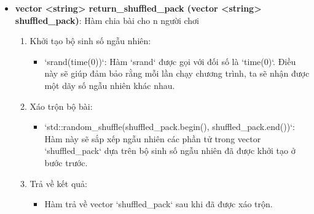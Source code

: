 \documentclass{article}
\begin{document}
\begin{itemize}
    \item \textbf{vector <string> return\_shuffled\_pack (vector <string> shuffled\_pack)}: Hàm chia bài cho n người chơi
    \begin{description}
        \begin{enumerate}
            \item Khởi tạo bộ sinh số ngẫu nhiên:
                \begin{itemize}
                    \item `srand(time(0))`: Hàm `srand` được gọi với đối số là `time(0)`. Điều này sẽ giúp đảm bảo rằng mỗi lần chạy chương trình, ta sẽ nhận được một dãy số ngẫu nhiên khác nhau.
                \end{itemize}
            \item Xáo trộn bộ bài:
                \begin{itemize}
                    \item `std::random\_shuffle(shuffled\_pack.begin(), shuffled\_pack.end())`: Hàm này sẽ sắp xếp ngẫu nhiên các phần tử trong vector `shuffled\_pack` dựa trên bộ sinh số ngẫu nhiên đã được khởi tạo ở bước trước.
                \end{itemize}
            \item Trả về kết quả:
                \begin{itemize}
                    \item Hàm trả về vector `shuffled\_pack` sau khi đã được xáo trộn.
                \end{itemize}
        \end{enumerate}
\end{description}


\end{itemize}
\end{document}
